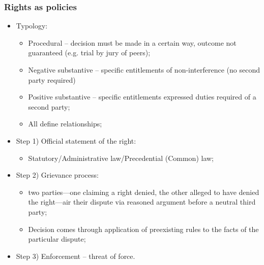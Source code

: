 \documentclass[aspectratio=169]{beamer}
\theoremstyle{principle}
\begin{document}
\begin{frame}
\frametitle{Rights as policies}

\begin{itemize}
\item Typology:
\begin{itemize}
\item Procedural -- decision must be made in a certain way, outcome not guaranteed (e.g. trial by jury of peers);
\item Negative substantive -- specific entitlements of non-interference (no second party required) 
\item Positive substantive -- specific entitlements expressed duties required of a second party;
\item All define relationships;
\end{itemize}
\bigskip
\bigskip
\item Step 1) Official statement of the right:
\begin{itemize}
\item Statutory/Administrative law/Precedential (Common) law;
\end{itemize}
\bigskip
\bigskip
\item Step 2) Grievance process:
\begin{itemize}
\item two parties—one claiming a right denied, the other alleged to have denied the right—air their dispute via reasoned argument
before a neutral third party;
\item Decision comes through application of preexisting rules to the facts of the particular dispute;
\end{itemize}
\bigskip
\bigskip
\item Step 3) Enforcement -- threat of force.
\end{itemize}

\end{frame}
\end{document}
